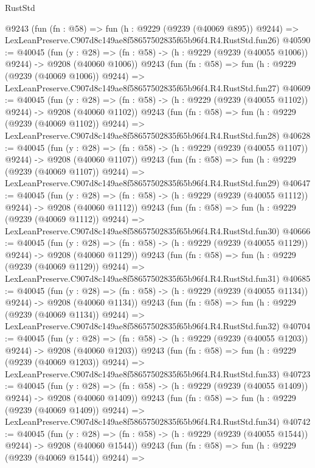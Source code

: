 \begin{lexlean}{RustStd}
\begin{coremodule}
    @9243
    (fun (fn : @58) =>
    fun (h : @9229 (@9239 (@40069 @895)) @9244) =>
    LexLeanPreserve.C907d8c149ae8f58657502835f65b96f4.R4.RustStd.fun26)
@40590 := @40045
    (fun (y : @28) =>
    (fn : @58) -> (h : @9229 (@9239 (@40055 @1006)) @9244) -> @9208 (@40060 @1006))
    @9243
    (fun (fn : @58) =>
    fun (h : @9229 (@9239 (@40069 @1006)) @9244) =>
    LexLeanPreserve.C907d8c149ae8f58657502835f65b96f4.R4.RustStd.fun27)
@40609 := @40045
    (fun (y : @28) =>
    (fn : @58) -> (h : @9229 (@9239 (@40055 @1102)) @9244) -> @9208 (@40060 @1102))
    @9243
    (fun (fn : @58) =>
    fun (h : @9229 (@9239 (@40069 @1102)) @9244) =>
    LexLeanPreserve.C907d8c149ae8f58657502835f65b96f4.R4.RustStd.fun28)
@40628 := @40045
    (fun (y : @28) =>
    (fn : @58) -> (h : @9229 (@9239 (@40055 @1107)) @9244) -> @9208 (@40060 @1107))
    @9243
    (fun (fn : @58) =>
    fun (h : @9229 (@9239 (@40069 @1107)) @9244) =>
    LexLeanPreserve.C907d8c149ae8f58657502835f65b96f4.R4.RustStd.fun29)
@40647 := @40045
    (fun (y : @28) =>
    (fn : @58) -> (h : @9229 (@9239 (@40055 @1112)) @9244) -> @9208 (@40060 @1112))
    @9243
    (fun (fn : @58) =>
    fun (h : @9229 (@9239 (@40069 @1112)) @9244) =>
    LexLeanPreserve.C907d8c149ae8f58657502835f65b96f4.R4.RustStd.fun30)
@40666 := @40045
    (fun (y : @28) =>
    (fn : @58) -> (h : @9229 (@9239 (@40055 @1129)) @9244) -> @9208 (@40060 @1129))
    @9243
    (fun (fn : @58) =>
    fun (h : @9229 (@9239 (@40069 @1129)) @9244) =>
    LexLeanPreserve.C907d8c149ae8f58657502835f65b96f4.R4.RustStd.fun31)
@40685 := @40045
    (fun (y : @28) =>
    (fn : @58) -> (h : @9229 (@9239 (@40055 @1134)) @9244) -> @9208 (@40060 @1134))
    @9243
    (fun (fn : @58) =>
    fun (h : @9229 (@9239 (@40069 @1134)) @9244) =>
    LexLeanPreserve.C907d8c149ae8f58657502835f65b96f4.R4.RustStd.fun32)
@40704 := @40045
    (fun (y : @28) =>
    (fn : @58) -> (h : @9229 (@9239 (@40055 @1203)) @9244) -> @9208 (@40060 @1203))
    @9243
    (fun (fn : @58) =>
    fun (h : @9229 (@9239 (@40069 @1203)) @9244) =>
    LexLeanPreserve.C907d8c149ae8f58657502835f65b96f4.R4.RustStd.fun33)
@40723 := @40045
    (fun (y : @28) =>
    (fn : @58) -> (h : @9229 (@9239 (@40055 @1409)) @9244) -> @9208 (@40060 @1409))
    @9243
    (fun (fn : @58) =>
    fun (h : @9229 (@9239 (@40069 @1409)) @9244) =>
    LexLeanPreserve.C907d8c149ae8f58657502835f65b96f4.R4.RustStd.fun34)
@40742 := @40045
    (fun (y : @28) =>
    (fn : @58) -> (h : @9229 (@9239 (@40055 @1544)) @9244) -> @9208 (@40060 @1544))
    @9243
    (fun (fn : @58) =>
    fun (h : @9229 (@9239 (@40069 @1544)) @9244) =>

\end{coremodule}
\end{lexlean}
